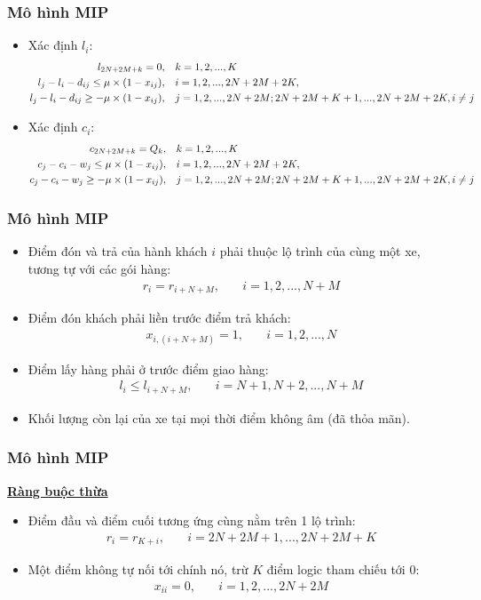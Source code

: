 \documentclass{beamer}
\begin{document}
	\begin{frame}
		\frametitle{Mô hình MIP}
		\begin{itemize}
			\item Xác định $l_i$:
			\begin{align}
				l_{2N+2M+k} = 0,\quad & k=1,2,...,K \\
				l_j - l_i -d_{ij}\leq \mu\times (1 - x_{ij}),\quad & i=1,2,...,2N+2M+2K, \\
				l_j - l_i -d_{ij}\geq -\mu\times (1 - x_{ij}),\quad & j=1,2,...,2N+2M;2N+2M+K+1,...,2N+2M+2K, i\ne j \notag
			\end{align}
			\item Xác định $c_i$:
			\begin{align}
				c_{2N+2M+k} = Q_k,\quad & k=1,2,...,K \\
				c_j - c_i - w_j\leq \mu\times (1 - x_{ij}),\quad & i=1,2,...,2N+2M+2K, \\
				c_j - c_i - w_j\geq -\mu\times (1 - x_{ij}),\quad & j=1,2,...,2N+2M;2N+2M+K+1,...,2N+2M+2K, i\ne j \notag \notag
			\end{align}
		\end{itemize}
	\end{frame}
	\begin{frame}
		\frametitle{Mô hình MIP}
		\begin{itemize}
			\item Điểm đón và trả của hành khách $i$ phải thuộc lộ trình của cùng một xe, tương tự với các gói hàng:
			\begin{align}
				r_i = r_{i+N+M},\quad & i=1,2,...,N+M
			\end{align}
			\item Điểm đón khách phải liền trước điểm trả khách:
			\begin{align}
				x_{i,(i+N+M)} = 1,\quad & i=1,2,...,N
			\end{align}
			\item Điểm lấy hàng phải ở trước điểm giao hàng:
			\begin{align}
				l_i \leq l_{i+N+M},\quad & i=N+1,N+2,...,N+M
			\end{align}
			\item Khối lượng còn lại của xe tại mọi thời điểm không âm (đã thỏa mãn).
		\end{itemize}
	\end{frame}
	\begin{frame}
		\frametitle{Mô hình MIP}
		\textbf{\underline{Ràng buộc thừa}}
		\begin{itemize}
			\item Điểm đầu và điểm cuối tương ứng cùng nằm trên 1 lộ trình:
			\begin{align}
				r_i=r_{K+i},\quad & i=2N+2M+1,...,2N+2M+K
			\end{align}
			\item Một điểm không tự nối tới chính nó, trừ $K$ điểm logic tham chiếu tới $0$:
			\begin{align}
				x_{ii}=0,\quad & i=1,2,...,2N+2M
			\end{align}
		\end{itemize}
	\end{frame}
\end{document}
